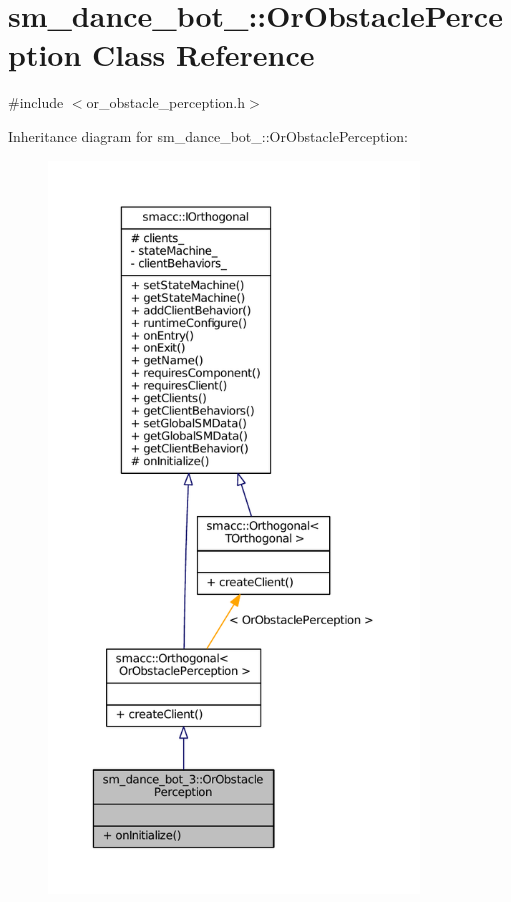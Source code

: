 \hypertarget{classsm__dance__bot__3_1_1OrObstaclePerception}{}\section{sm\+\_\+dance\+\_\+bot\+\_\+:\+:Or\+Obstacle\+Perception Class Reference}
\label{classsm__dance__bot__3_1_1OrObstaclePerception}


{\ttfamily \#include $<$or\+\_\+obstacle\+\_\+perception.\+h$>$}



Inheritance diagram for sm\+\_\+dance\+\_\+bot\+\_\+:\+:Or\+Obstacle\+Perception\+:
\nopagebreak
\begin{figure}[H]
\begin{center}
\leavevmode
\includegraphics[height=550pt]{classsm__dance__bot__3_1_1OrObstaclePerception__inherit__graph}
\end{center}
\end{figure}


